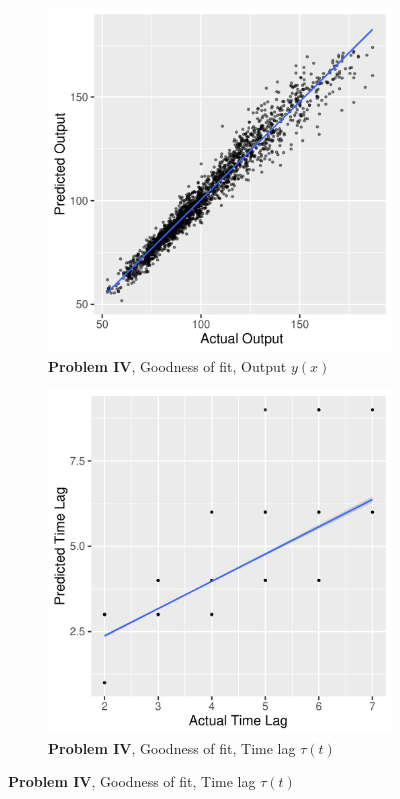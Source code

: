 \begin{figure}
  \centering

  \begin{subfigure}[b]{0.4\textwidth}
    \centering
    \includegraphics[width=\textwidth]{figures/exp4_scatter_v_test}
    \caption{ \textbf{Problem IV}, Goodness of fit, Output $y(x)$}
    \label{fig:problem4_fitv}
  \end{subfigure}
  \hfill
  \begin{subfigure}[b]{0.4\textwidth}
    \centering
    \includegraphics[width=\textwidth]{figures/exp4_scatter_t_test}
    \caption{ \textbf{Problem IV}, Goodness of fit, Time lag $\tau(t)$ }
    \label{fig:problem4_fitt}
  \end{subfigure}
  

\end{figure}
